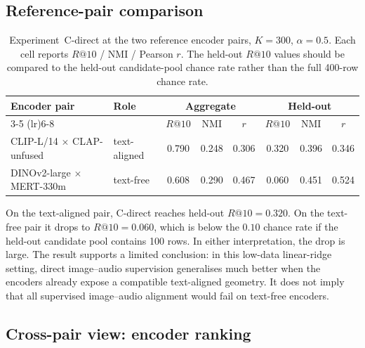 \subsection{Reference-pair comparison}


\begin{table}[!ht]
\centering
\small
\setlength{\tabcolsep}{5pt}
\begin{tabular}{l l ccc ccc}
\toprule
Encoder pair & Role & \multicolumn{3}{c}{Aggregate} & \multicolumn{3}{c}{Held-out} \\
        \cmidrule(lr){3-5} \cmidrule(lr){6-8}
 &  & $R@10$ & NMI & $r$ & $R@10$ & NMI & $r$ \\
\midrule
CLIP-L/14 $\times$ CLAP-unfused & text-aligned & 0.790 & 0.248 & 0.306 & 0.320 & 0.396 & 0.346 \\
DINOv2-large $\times$ MERT-330m & text-free & 0.608 & 0.290 & 0.467 & 0.060 & 0.451 & 0.524 \\
\bottomrule
\end{tabular}
\caption{Experiment~C-direct at the two reference encoder pairs, $K=300$, $\alpha=0.5$. Each cell reports $R@10$ / NMI / Pearson $r$. The held-out $R@10$ values should be compared to the held-out candidate-pool chance rate rather than the full 400-row chance rate.}
\label{tab:cdirect-refpairs}
\end{table}

On the text-aligned pair, C-direct reaches held-out $R@10=0.320$. On
the text-free pair it drops to $R@10=0.060$, which is below the
$0.10$ chance rate if the held-out candidate pool contains 100 rows.
In either interpretation, the drop is large. The result supports a
limited conclusion: in this low-data linear-ridge setting, direct
image--audio supervision generalises much better when the encoders
already expose a compatible text-aligned geometry. It does not imply
that all supervised image--audio alignment would fail on text-free
encoders.

\subsection{Cross-pair view: encoder ranking}


